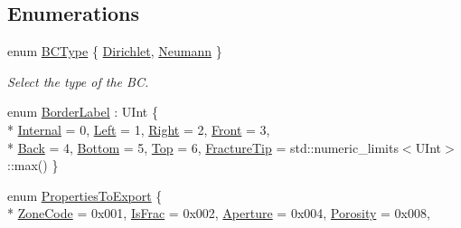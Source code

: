 \subsection*{Enumerations}
\begin{DoxyCompactItemize}
\item 
enum \hyperlink{namespaceFVCode3D_a73660061f11f1671164ce171a053f8c5}{B\+C\+Type} \{ \hyperlink{namespaceFVCode3D_a73660061f11f1671164ce171a053f8c5a192024697bdaa4fbbb39b8961b747bce}{Dirichlet}, 
\hyperlink{namespaceFVCode3D_a73660061f11f1671164ce171a053f8c5a30212425b27314b01b40f4984dbf850a}{Neumann}
 \}\begin{DoxyCompactList}\small\item\em Select the type of the BC. \end{DoxyCompactList}
\item 
enum \hyperlink{namespaceFVCode3D_a604c2047b7f400e68b30a8132178c822}{Border\+Label} \+: U\+Int \{ \\*
\hyperlink{namespaceFVCode3D_a604c2047b7f400e68b30a8132178c822a7d38403d00598d4bb163911f9aa48294}{Internal} = 0, 
\hyperlink{namespaceFVCode3D_a604c2047b7f400e68b30a8132178c822a7fd633652b3723bb7716b9db0314a61e}{Left} = 1, 
\hyperlink{namespaceFVCode3D_a604c2047b7f400e68b30a8132178c822a27ec5db52b31c4eba9e240374723f76e}{Right} = 2, 
\hyperlink{namespaceFVCode3D_a604c2047b7f400e68b30a8132178c822a2b5e7fb79a56dd77e3c62bccd52238e4}{Front} = 3, 
\\*
\hyperlink{namespaceFVCode3D_a604c2047b7f400e68b30a8132178c822a10461eade3dd091368236f82c6f7f498}{Back} = 4, 
\hyperlink{namespaceFVCode3D_a604c2047b7f400e68b30a8132178c822aba9e7af6197fd20512d8f2562e913711}{Bottom} = 5, 
\hyperlink{namespaceFVCode3D_a604c2047b7f400e68b30a8132178c822a52ff9b0d3195e16d3d8aed882b7e19dd}{Top} = 6, 
\hyperlink{namespaceFVCode3D_a604c2047b7f400e68b30a8132178c822a72636637126378d1cd731f1382a736c9}{Fracture\+Tip} = std\+:\+:numeric\+\_\+limits$<$U\+Int$>$\+:\+:max()
 \}
\item 
enum \hyperlink{namespaceFVCode3D_ab3abc77722284ce4344be90bb61c1a41}{Properties\+To\+Export} \{ \\*
\hyperlink{namespaceFVCode3D_ab3abc77722284ce4344be90bb61c1a41a98a639655750204022119fd2d64ecdf0}{Zone\+Code} = 0x001, 
\hyperlink{namespaceFVCode3D_ab3abc77722284ce4344be90bb61c1a41ad2b21a53311e3478541b39809a3877b9}{Is\+Frac} = 0x002, 
\hyperlink{namespaceFVCode3D_ab3abc77722284ce4344be90bb61c1a41a7bea6d441c4661b396fc86912312c47e}{Aperture} = 0x004, 
\hyperlink{namespaceFVCode3D_ab3abc77722284ce4344be90bb61c1a41a8bb92532e203b2a2b45c4b2ce0354a90}{Porosity} = 0x008, 

\end{DoxyCompactItemize}
